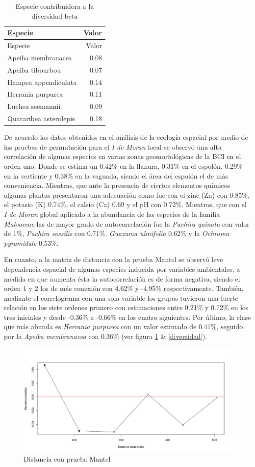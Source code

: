 \documentclass[11pt,]{article}
\begin{document}
\begin{longtable}[]{@{}lr@{}}
\caption{Especie contribuidora a la diversidad
beta\label{beta}}\tabularnewline
\toprule
Especie & Valor\tabularnewline
\midrule
\endfirsthead
\toprule
Especie & Valor\tabularnewline
\midrule
\endhead
Apeiba membranacea & 0.08\tabularnewline
Apeiba tibourbou & 0.07\tabularnewline
Hampea appendiculata & 0.14\tabularnewline
Herrania purpurea & 0.11\tabularnewline
Luehea seemannii & 0.09\tabularnewline
Quararibea asterolepis & 0.18\tabularnewline
\bottomrule
\end{longtable}

De acuerdo los datos obtenidos en el análisis de la ecología espacial
por medio de las pruebas de permutación para el \emph{I de Moran} local
se observó una alta correlación de algunas especies en varias zonas
geomorfológicas de la BCI en el orden uno. Donde se estima un 0.42\% en
la llanura, 0.31\% en el espolón, 0.29\% en la vertiente y 0.38\% en la
vaguada, siendo el área del espolón el de más conveniencia. Mientras,
que ante la presencia de ciertos elementos químicos algunas plantas
presentaron una adecuación como fue con el zinc (Zn) con 0.85\%, el
potasio (K) 0.74\%, el calsio (Ca) 0.69 y el pH con 0.72\%. Mientras,
que con el \emph{I de Moran} global aplicado a la abundancia de las
especies de la familia \emph{Malvaceae} las de mayor grado de
autocorrelación fue la \emph{Pachira quinata} con valor de 1\%,
\emph{Pachira sessilis} con 0.71\%, \emph{Guazuma ulmifolia} 0.62\% y la
\emph{Ochroma pyramidale} 0.53\%.

En cuanto, a la matriz de distancia con la prueba Mantel se observó leve
dependencia espacial de algunas especies inducida por variables
ambientales, a medida en que aumenta ésta la autocorrelación es de forma
negativa, siendo el orden 1 y 2 los de más conexión con 4.62\% y -4.95\%
respectivamente. También, mediante el correlograma con una sola variable
los grupos tuvieron una fuerte relación en los siete ordenes primero con
estimaciones entre 0.21\% y 0.72\% en los tres iniciales y desde -0.36\%
a -0.66\% en los cuatro siguientes. Por último, la clase que más abunda
es \emph{Herrania purpurea} con un valor estimado de 0.41\%, seguido por
la \emph{Apeiba membranacea} con 0.36\% (ver figura \ref{distancia} \&
\ref{diversidad}).

\begin{figure}
\centering
\includegraphics[width=1.00000\textwidth]{ecologia_espacial_files/figure-markdown_github/unnamed-chunk-14-1.png}
\caption{Distancia con prueba Mantel\label{distancia}}
\end{figure}
\end{document}
